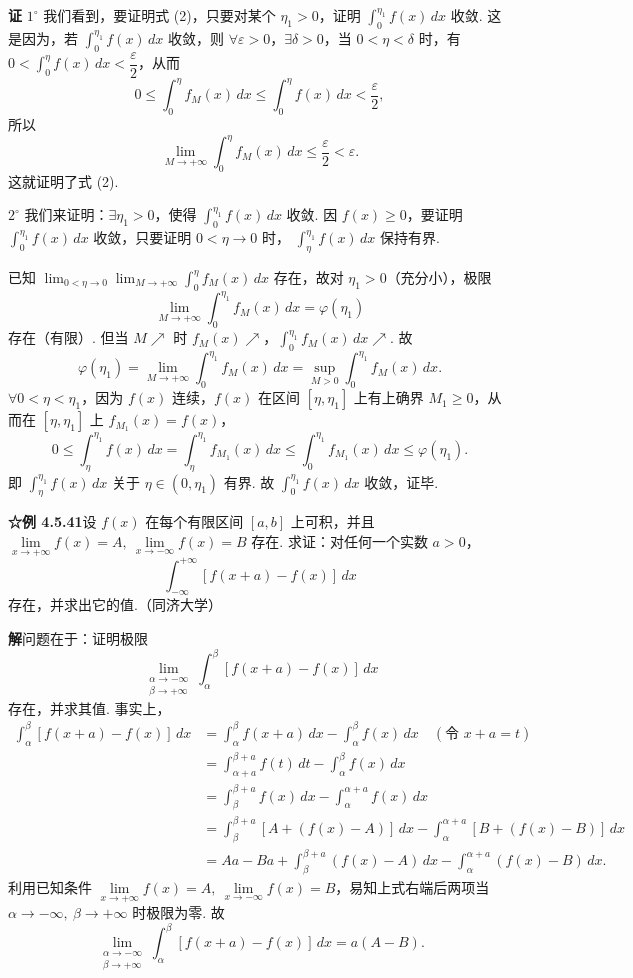 \documentclass[UTF8, 12pt, fontset=fandol, oneside]{ctexart}
\begin{document}
\noindent\textbf{证}\quad
$1^\circ$ 我们看到，要证明式 (2)，只要对某个 $\eta_1>0$，证明 $\displaystyle\int_0^{\eta_1}f(x)\,dx$ 收敛.
这是因为，若 $\displaystyle\int_0^{\eta_1}f(x)\,dx$ 收敛，则 $\forall\varepsilon>0$，$\exists\delta>0$，当 $0<\eta<\delta$ 时，有
$0<\displaystyle\int_0^\eta f(x)\,dx<\dfrac\varepsilon2$，从而
\[
0\le\int_0^\eta f_M(x)\,dx\le\int_0^\eta f(x)\,dx<\frac\varepsilon2,
\]
所以
\[
\lim_{M\to+\infty}\int_0^\eta f_M(x)\,dx\le\frac\varepsilon2<\varepsilon.
\]
这就证明了式 (2).

$2^\circ$ 我们来证明：$\exists\eta_1>0$，使得 $\displaystyle\int_0^{\eta_1}f(x)\,dx$ 收敛.
因 $f(x)\ge0$，要证明 $\displaystyle\int_0^{\eta_1}f(x)\,dx$ 收敛，只要证明 $0<\eta\to0$ 时，
$\displaystyle\int_\eta^{\eta_1}f(x)\,dx$ 保持有界.

已知 $\displaystyle\lim_{0<\eta\to0}\lim_{M\to+\infty}\int_0^\eta f_M(x)\,dx$ 存在，故对 $\eta_1>0$（充分小），极限
\[
\lim_{M\to+\infty}\int_0^{\eta_1}f_M(x)\,dx=\varphi(\eta_1)
\]
存在（有限）. 但当 $M\nearrow$ 时 $f_M(x)\nearrow$，$\displaystyle\int_0^{\eta_1}f_M(x)\,dx\nearrow$. 故
\begin{equation}
\varphi(\eta_1)=\lim_{M\to+\infty}\int_0^{\eta_1}f_M(x)\,dx
=\sup_{M>0}\int_0^{\eta_1}f_M(x)\,dx. \tag{3}
\end{equation}
$\forall 0<\eta<\eta_1$，因为 $f(x)$ 连续，$f(x)$ 在区间 $[\eta,\eta_1]$ 上有上确界 $M_1\ge0$，从而在 $[\eta,\eta_1]$ 上
$f_{M_1}(x)=f(x)$，
\[
0\le\int_\eta^{\eta_1}f(x)\,dx
=\int_\eta^{\eta_1}f_{M_1}(x)\,dx
\le\int_0^{\eta_1}f_{M_1}(x)\,dx
\le\varphi(\eta_1).
\]
即 $\displaystyle\int_\eta^{\eta_1}f(x)\,dx$ 关于 $\eta\in(0,\eta_1)$ 有界. 故
$\displaystyle\int_0^{\eta_1}f(x)\,dx$ 收敛，证毕.

\noindent\textbf{☆例 4.5.41}\quad 设 $f(x)$ 在每个有限区间 $[a,b]$ 上可积，并且
$\lim\limits_{x\to+\infty}f(x)=A,\ \lim\limits_{x\to-\infty}f(x)=B$ 存在. 求证：对任何一个实数 $a>0$，
\[
\int_{-\infty}^{+\infty}[f(x+a)-f(x)]\,dx
\]
存在，并求出它的值.（同济大学）

\noindent\textbf{解}\quad 问题在于：证明极限
\[
\lim_{\substack{\alpha\to-\infty\\ \beta\to+\infty}}
\int_\alpha^\beta[f(x+a)-f(x)]\,dx
\]
存在，并求其值. 事实上，
\[
\begin{aligned}
\int_\alpha^\beta[f(x+a)-f(x)]\,dx
&=\int_\alpha^\beta f(x+a)\,dx-\int_\alpha^\beta f(x)\,dx\quad(\text{令 }x+a=t)\\
&=\int_{\alpha+a}^{\beta+a}f(t)\,dt-\int_\alpha^\beta f(x)\,dx\\
&=\int_\beta^{\beta+a}f(x)\,dx-\int_\alpha^{\alpha+a}f(x)\,dx\\
&=\int_\beta^{\beta+a}[A+(f(x)-A)]\,dx-\int_\alpha^{\alpha+a}[B+(f(x)-B)]\,dx\\
&=Aa-Ba+\int_\beta^{\beta+a}(f(x)-A)\,dx-\int_\alpha^{\alpha+a}(f(x)-B)\,dx.
\end{aligned}
\]
利用已知条件 $\lim\limits_{x\to+\infty}f(x)=A,\ \lim\limits_{x\to-\infty}f(x)=B$，易知上式右端后两项当
$\alpha\to-\infty,\ \beta\to+\infty$ 时极限为零. 故
\[
\lim_{\substack{\alpha\to-\infty\\ \beta\to+\infty}}
\int_\alpha^\beta[f(x+a)-f(x)]\,dx=a(A-B).
\]
\end{document}
